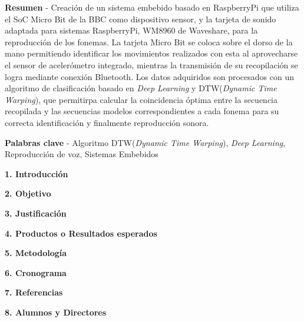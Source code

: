 \documentclass[10pt]{report}
\begin{document}


\hfill\break
\justifying
\textbf{Resumen} - Creación de un sistema embebido basado en RaspberryPi que utiliza el SoC Micro Bit de la BBC como dispositivo sensor, y la tarjeta de sonido adaptada para sistemas RaspberryPi, WM8960 de Waveshare, para la reproducción de los fonemas. La tarjeta Micro Bit se coloca sobre el dorso de la mano permitiendo identificar los movimientos realizados con esta al aprovecharse el sensor de acelerómetro integrado, mientras la transmisión de su recopilación se logra mediante conexión Bluetooth. Los datos adquiridos son procesados con un algoritmo de clasificación basado en \textit{Deep Learning} y DTW(\textit{Dynamic Time Warping}), que permitirpa calcular la coincidencia óptima entre la secuencia recopilada y las secuencias modelos correspondientes a cada fonema para su correcta identificación y finalmente reproducción sonora.

\hfill \break
\textbf{Palabras clave} - Algoritmo DTW(\textit{Dynamic Time Warping}), \textit{Deep Learning}, Reproducción de voz, Sistemas Embebidos

\hfill \break
{\fontsize{12}{14}\textbf{1. Introducción}}
\hfill \break


\hfill \break
{\fontsize{12}{14}\textbf{2. Objetivo}}
\hfill \break
\justifying


\hfill \break
{\fontsize{12}{14}\textbf{3. Justificación}}

\hfill \break
{\fontsize{12}{14}\textbf{4. Productos o Resultados esperados}}

\hfill \break
{\fontsize{12}{14}\textbf{5. Metodología}}

\hfill \break
{\fontsize{12}{14}\textbf{6. Cronograma}}

\hfill \break

\newpage

{\fontsize{12}{14}\textbf{7. Referencias}}

\printbibliography

\hfill \break

\newpage

{\fontsize{12}{14}\textbf{8. Alumnos y Directores}}


\end{document}
